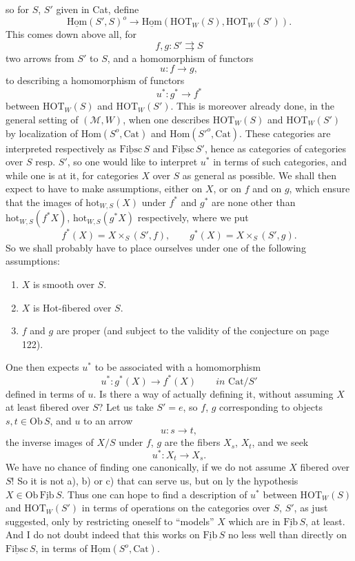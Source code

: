 \documentclass[11pt]{article}
\newcommand{\printedpage}[1]{\marginpar{\footnotesize p.~#1}}
\newcommand{\msp}[1]{\marginpar{\footnotesize [#1]}}
\newcommand{\HOT}{\mathrm{HOT}}
\newcommand{\Cat}{\mathrm{Cat}}
\newcommand{\Ob}{\mathrm{Ob}}
\newcommand{\hot}{\mathrm{hot}}
\newcommand{\uHom}{\underline{\mathrm{Hom}}}
\newcommand{\uFib}{\underline{\mathrm{Fib}}}
\newcommand{\uFibsc}{\underline{\mathrm{Fibsc}}}
\begin{document}
\printedpage{79}

so for $S$, $S'$ given in Cat, define
\[ \uHom(S',S)^o \longrightarrow \uHom(\HOT_W(S),\HOT_W(S')). \]
This comes down above all, for
\[ f,g : S' \rightrightarrows S \]
two arrows from $S'$ to $S$, and a homomorphism of functors
\[ u : f \longrightarrow g, \]
to describing a homomorphism of functors
\[ u^* : g^* \longrightarrow f^* \]
between $\HOT_W(S)$ and $\HOT_W(S')$. This is moreover already done, in the general setting of $(\mathcal{M},W)$, when one describes $\HOT_W(S)$ and $\HOT_W(S')$ by localization of $\mathrm{Hom}(S^o,\Cat)$ and $\mathrm{Hom}(S'^o,\Cat)$. These categories are interpreted respectively as $\uFibsc\,S$ and $\uFibsc\,S'$, hence as categories of categories over $S$ resp. $S'$, so one would like to interpret $u^*$ in terms of such categories, and while one is at it, for categories $X$ over $S$ as general as possible. We shall
\msp{page 129}
then expect to have to make assumptions, either on $X$, or on $f$ and on $g$, which ensure that the images of $\hot_{W,S}(X)$ under $f^*$ and $g^*$ are none other than $\hot_{W,S}(f^*X)$, $\hot_{W,S}(g^*X)$ respectively, where we put
\[ f^*(X) = X \times_S (S',f), \qquad g^*(X) = X \times_S (S',g). \]
So we shall probably have to place ourselves under one of the following assumptions:
\begin{enumerate}
\item[a)] $X$ is smooth over $S$.
\item[b)] $X$ is Hot-fibered over $S$.
\item[c)] $f$ and $g$ are proper (and subject to the validity of the conjecture on page 122).
\end{enumerate}
One then expects $u^*$ to be associated with a homomorphism
\[ u^* : g^*(X) \longrightarrow f^*(X) \qquad \textit{in } \Cat/S' \]
defined in terms of $u$. Is there a way of actually defining it, without assuming $X$ at least fibered over $S$? Let us take $S'=e$, so $f$, $g$ corresponding to objects $s,t\in\Ob\,S$, and $u$ to an arrow %
\[ u : s \longrightarrow t, \]
the inverse images of $X/S$ under $f$, $g$ are the fibers $X_s$, $X_t$, and we seek
\[ u^* : X_t \longrightarrow X_s. \]
We have no chance of finding one canonically, if we do not assume $X$ fibered over $S$! So it is not a), b) or c) that can serve us, but on%
\printedpage{80}%
\msp{page 130}%
ly the hypothesis $X\in\Ob\,\uFib\,S$. Thus one can hope to find a description of $u^*$ between $\HOT_W(S)$ and $\HOT_W(S')$ in terms of operations on the categories over $S$, $S'$, as just suggested, only by restricting oneself to ``models'' $X$ which are in $\uFib\,S$, at least. And I do not doubt indeed that this works on $\uFib\,S$ no less well than directly on $\uFibsc\,S$, in terms of $\uHom(S^o,\Cat)$.
\end{document}
